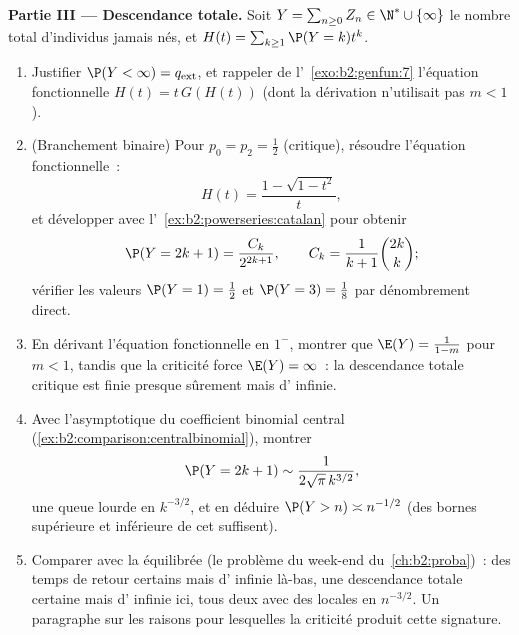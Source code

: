 \begin{problem}
\medskip
\noindent\textbf{Partie III --- Descendance totale.} Soit $Y =
\sum_{n\geq0}Z_n \in \N^* \cup \{\infty\}$ le nombre total
d'individus jamais nés, et $H(t) =
\sum_{k\geq1}\P(Y = k)t^k$.
\begin{enumerate}[resume]
  \item Justifier $\P(Y < \infty) = q_{\mathrm{ext}}$, et
        rappeler de l'~\cref{exo:b2:genfun:7} l'équation fonctionnelle
        $H(t) = t\,G(H(t))$ (dont la dérivation n'utilisait
        pas $m < 1$).
  \item (Branchement binaire) Pour $p_0 = p_2 = \frac12$
        (critique), résoudre l'équation fonctionnelle~:
        \[
        H(t) = \frac{1 - \sqrt{1 - t^2}}{t},
        \]
        et développer avec l'~\cref{ex:b2:powerseries:catalan} pour
        obtenir
        \[
        \P(Y = 2k + 1) = \frac{C_k}{2^{2k+1}},
        \qquad C_k = \frac1{k+1}\binom{2k}k ;
        \]
        vérifier les valeurs $\P(Y = 1) = \frac12$ et $\P(Y = 3)
        = \frac18$ par dénombrement direct.
  \item En dérivant l'équation fonctionnelle en $1^-$,
        montrer que $\E(Y) = \frac{1}{1-m}$ pour $m < 1$, tandis que
        la criticité force $\E(Y) = \infty$~: la descendance totale
        critique est finie presque sûrement mais d' infinie.
  \item Avec l'asymptotique du coefficient binomial central
        (\cref{ex:b2:comparison:centralbinomial}), montrer
        \[
        \P(Y = 2k+1) \sim \frac{1}{2\sqrt\pi\,k^{3/2}},
        \]
        une queue lourde en $k^{-3/2}$, et en déduire $\P(Y > n)
        \asymp n^{-1/2}$ (des bornes supérieure et inférieure de cet
         suffisent).
  \item Comparer avec la  équilibrée (le problème du
        week-end du~\cref{ch:b2:proba})~: des temps de retour certains
        mais d' infinie là-bas, une descendance totale
        certaine mais d' infinie ici, tous deux avec des
         locales en $n^{-3/2}$. Un paragraphe sur les raisons pour
        lesquelles la criticité produit cette signature.
\end{enumerate}


\end{problem}
